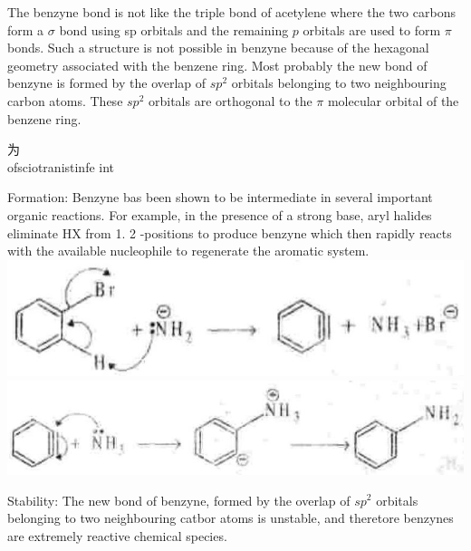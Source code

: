 \documentclass[10pt]{article}
\begin{document}
The benzyne bond is not like the triple bond of acetylene where the two carbons form a $\sigma$ bond using sp orbitals and the remaining $p$ orbitals are used to form $\pi$ bonds. Such a structure is not possible in benzyne because of the hexagonal geometry associated with the benzene ring. Most probably the new bond of benzyne is formed by the overlap of $s p^{2}$ orbitals belonging to two neighbouring carbon atoms. These $s p^{2}$ orbitals are orthogonal to the $\pi$ molecular orbital of the benzene ring.

为\\
ofsciotranistinfe int

Formation: Benzyne bas been shown to be intermediate in several important organic reactions. For example, in the presence of a strong base, aryl halides eliminate HX from 1. 2 -positions to produce benzyne which then rapidly reacts with the available nucleophile to regenerate the aromatic system.\\
\includegraphics[max width=\textwidth, center]{2025_01_28_8470952b98110cec3aabg-090(1)}\\
\includegraphics[max width=\textwidth, center]{2025_01_28_8470952b98110cec3aabg-090}

Stability: The new bond of benzyne, formed by the overlap of $s p^{2}$ orbitals belonging to two neighbouring catbor atoms is unstable, and theretore benzynes are extremely reactive chemical species.
\end{document}
